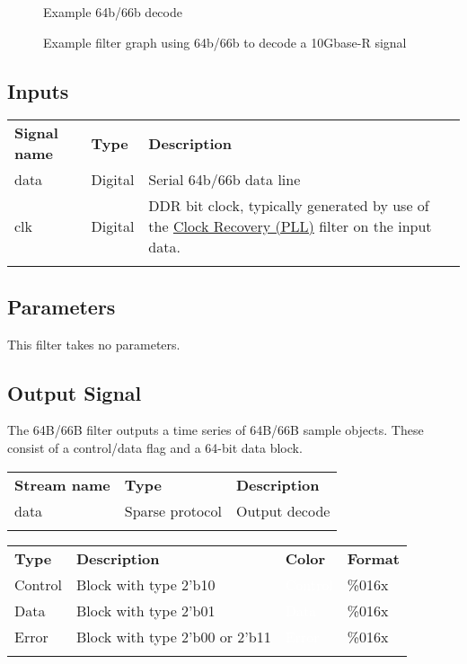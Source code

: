 \begin{figure}[h]
\centering
{}
\caption{Example 64b/66b decode}
\label{filter_64b66b}
\end{figure}

\begin{figure}[h]
\centering
{}
\caption{Example filter graph using 64b/66b to decode a 10Gbase-R signal}
\label{filter_graph_64b66b}
\end{figure}

\subsection{Inputs}

\begin{tabularx}{16cm}{llX}
\thickhline
\textbf{Signal name} & \textbf{Type} & \textbf{Description} \\
\thickhline
data & Digital & Serial 64b/66b data line \\
\thinhline
clk & Digital & DDR bit clock, typically generated by use of the \hyperref[filter:cdrpll]{Clock Recovery
(PLL)} filter on the input data.\\
\thickhline
\end{tabularx}

\subsection{Parameters}

This filter takes no parameters.

\subsection{Output Signal}

The 64B/66B filter outputs a time series of 64B/66B sample objects. These consist of a control/data flag and
a 64-bit data block.

\begin{tabularx}{16cm}{llX}
\thickhline
\textbf{Stream name} & \textbf{Type} & \textbf{Description} \\
\thickhline
data & Sparse protocol & Output decode \\
\thickhline
\end{tabularx}

\begin{tabularx}{16cm}{lllX}
\thickhline
\textbf{Type} & \textbf{Description} & \textbf{Color} & \textbf{Format} \\
\thickhline
Control & Block with type 2'b10 & \cellcolor{control}\textcolor{white}{Control} & \%016x \\
\thinhline
Data & Block with type 2'b01 & \cellcolor{data}\textcolor{white}{Data} & \%016x \\
\thinhline
Error & Block with type 2'b00 or 2'b11 & \cellcolor{error}\textcolor{white}{Error} & \%016x \\
\thickhline
\end{tabularx}

